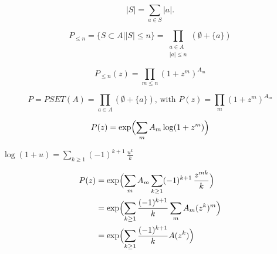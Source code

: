 \documentclass[10pt]{book}
\begin{document}
\begin{mdSnippets}
\begin{mdDisplaySnippet}[c1ab68d317b7b263fb9e31604987145d]%
\[%
|S|=\sum_{a\in S}|a|.
\]%
\end{mdDisplaySnippet}%
\begin{mdDisplaySnippet}%
\[%
P_{\leq n} = \{S\subset A||S|\leq n\} = \prod_{\substack{a\in A\\|a|\leq n}}(\emptyset+\{a\})
\]%
\end{mdDisplaySnippet}%
\begin{mdDisplaySnippet}[ab45d3bfb9608582184520ca67f39f00]%
\[%
P_{\leq n}(z)=\prod_{m\leq n}(1+z^m)^{A_m}
\]%
\end{mdDisplaySnippet}%
\begin{mdDisplaySnippet}[3629cc0747588690e68ca5fb992aa1e4]%
\[%
P=PSET(A)=\prod_{a\in A}(\emptyset + \{a\})\text{, with }
P(z)=\prod_{m}(1+z^m)^{A_m} 
\]%
\end{mdDisplaySnippet}%
\begin{mdDisplaySnippet}%
\[%
P(z) = \exp\Bigl(\sum_m A_m\log(1+z^m)\Bigr)
\]%
\end{mdDisplaySnippet}%
\begin{mdInlineSnippet}%
$\log(1+u)=\sum_{k\geq 1}(-1)^{k+1}\,\frac{u^k}{k}$\end{mdInlineSnippet}%
\begin{mdDisplaySnippet}[f62d677497515d977793cce77a1f1d21]%
\[%
\begin{aligned}
P(z) & = \exp\Bigl(\sum_m A_m\sum_{k\geq1}(-1)^{k+1}\,\frac{z^{mk}}{k}\Bigr)\\
     & = \exp\Bigl(\sum_{k\geq1}\frac{(-1)^{k+1}}{k}\sum_m A_m (z^k)^m\Bigr)\\
     & = \exp\Bigl(\sum_{k\geq1}\frac{(-1)^{k+1}}{k} A(z^k)\Bigr) 
\end{aligned}
\]%
\end{mdDisplaySnippet}%

\end{mdSnippets}
\end{document}
